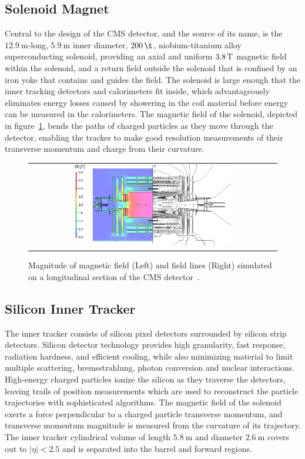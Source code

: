 \subsection{Solenoid Magnet}
Central to the design of the CMS detector, and the source of its name, is the $\SI{12.9}{\m}$-long, $\SI{5.9}{\m}$ inner diameter, $\SI{200}{\t}$, niobium-titanium alloy superconducting solenoid, providing an axial and uniform $\SI{3.8}{\T}$ magnetic field within the solenoid, and a return field outside the solenoid that is confined by an iron yoke that contains and guides the field.
The solenoid is large enough that the inner tracking detectors and calorimeters fit inside, which advantageously eliminates energy losses caused by showering in the coil material before energy can be measured in the calorimeters.
The magnetic field of the solenoid, depicted in figure~\ref{Solenoid}, bends the paths of charged particles as they move through the detector, enabling the tracker to make good resolution measurements of their transverse momentum and charge from their curvature.
\begin{figure}[htb]
  \begin{center}
    \begin{tabular}{c}
        \includegraphics[width=0.65\textwidth]{fig_LHC_CMS/Solenoid.png}
    \end{tabular}
    \caption{Magnitude of magnetic field (Left) and field lines (Right) simulated on a longitudinal section of the CMS detector~\cite{Chatrchyan:1215500}.
            }
    \label{Solenoid}
  \end{center}
\end{figure}


\subsection{Silicon Inner Tracker}
The inner tracker consists of silicon pixel detectors surrounded by silicon strip detectors.
Silicon detector technology provides high granularity, fast response, radiation hardness, and efficient cooling, while also minimizing material to limit multiple scattering, bremsstrahlung, photon conversion and nuclear interactions.
High-energy charged particles ionize the silicon as they traverse the detectors, leaving trails of position measurements which are used to reconstruct the particle trajectories with sophisticated algorithms.
The magnetic field of the solenoid exerts a force perpendicular to a charged particle transverse momentum, and transverse momentum magnitude is measured from the curvature of its trajectory.
The inner tracker cylindrical volume of length $\SI{5.8}{\m}$ and diameter $\SI{2.6}{\m}$ covers out to $\vert \eta \vert < 2.5$ and is separated into the barrel and forward regions.

